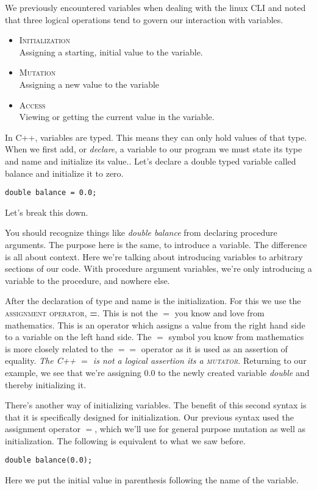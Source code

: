 \documentclass[]{tufte-handout}
\begin{document}
We previously encountered variables when dealing with the linux CLI and noted that three logical operations tend to govern our interaction with variables.
\begin{itemize}
\item \textsc{Initialization} \\
Assigning a starting, initial value to the variable.
\item \textsc{Mutation} \\
Assigning a new value to the variable
\item \textsc{Access} \\
Viewing or getting the current value in the variable.
\end{itemize}

In C++, variables are typed. This means they can only hold values of that type. When we first add, or \textit{declare}, a variable to our program we must state its type and name and initialize its value.. Let's declare a double typed variable called balance and initialize it to zero. 
\begin{verbatim}
double balance = 0.0;
\end{verbatim}
Let's break this down. 

You should recognize things like \textit{double balance} from declaring procedure arguments. The purpose here is the same, to introduce a variable. The difference is all about context. Here we're talking about introducing variables to arbitrary sections of our code. With procedure argument variables, we're only introducing a variable to the procedure, and nowhere else. 

After the declaration of type and name is the initialization. For this we use the \textsc{assignment operator}, \textbf{=}.  This is not the $=$ you know and love from mathematics. This is an operator which assigns a value from the right hand side to a variable on the left hand side. The $=$ symbol you know from mathematics is more closely related to the $==$ operator as it is used as an assertion of equality. \textit{The C++ $=$ is not a logical assertion its a \textsc{mutator}}.  Returning to our example, we see that we're assigning $0.0$ to the newly created variable \textit{double} and thereby initializing it.   

There's another way of initializing variables. The benefit of this second syntax is that it is specifically designed for initialization. Our previous syntax used the assignment operator $=$, which we'll use for general purpose mutation as well as initialization. The following is equivalent to what we saw before.
\begin{verbatim}
double balance(0.0);
\end{verbatim}
Here we put the initial value in parenthesis following the name of the variable.
\end{document}
